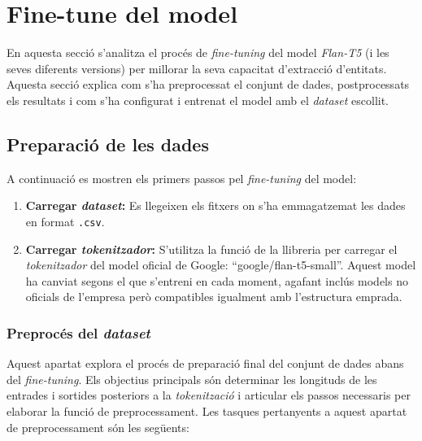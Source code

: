 \section{Fine-tune del model}
\label{sec:fine-tune}
En aquesta secció s'analitza el procés de \textit{fine-tuning} del model \textit{Flan-T5} (i les seves diferents versions) per millorar la seva capacitat d'extracció d'entitats. Aquesta secció explica com s'ha preprocessat el conjunt de dades, postprocessats els resultats i com s'ha configurat i entrenat el model amb el \textit{dataset} escollit.

\subsection{Preparació de les dades}
A continuació es mostren els primers passos pel \textit{fine-tuning} del model:

\begin{enumerate}
    \item \textbf{Carregar \textit{dataset}:} Es llegeixen els fitxers on s'ha emmagatzemat les dades en format \texttt{.csv}.
    \item \textbf{Carregar \textit{tokenitzador}:} S'utilitza la funció  de la llibreria  per carregar el \textit{tokenitzador} del model oficial de Google: ``google/flan-t5-small''. Aquest model ha canviat segons el que s'entreni en cada moment, agafant inclús models no oficials de l'empresa però compatibles igualment amb l'estructura emprada.
\end{enumerate}


\subsubsection{Preprocés del \textit{dataset}}
Aquest apartat explora el procés de preparació final del conjunt de dades abans del \textit{fine-tuning}. Els objectius principals són determinar les longituds de les entrades i sortides posteriors a la \textit{tokenització} i articular els passos necessaris per elaborar la funció de preprocessament. Les tasques pertanyents a aquest apartat de preprocessament són les següents:

